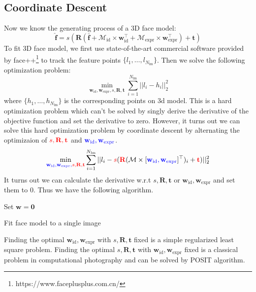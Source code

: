 \subsection{Coordinate Descent}
Now we know the generating process of a 3D face model:
$$\hat{\mathbf{f}} = s (\mathbf{R} (\bar{\mathbf{f}} + \mathcal{M}_{\text{id}} \times \mathbf{w}_{\text{id}}^\top + \mathcal{M}_{\text{expr}}\times \mathbf{w}_{\text{expr}}^\top) + \mathbf{t})$$
To fit 3D face model, we first use state-of-the-art commercial software provided by face++\footnote{https://www.faceplusplus.com.cn/} to track the feature points $\{l_1, \dots, l_{N_{\text{lm}}}\}$. Then we solve the following optimization problem:
$$\min_{\mathbf{w}_{\text{id}}, \mathbf{w}_{\text{expr}}, s, \mathbf{R}, \mathbf{t}} \sum_{i=1}^{N_{\text{lm}}}||l_i - h_i||_2^2$$
where $\{h_1, \dots, h_{N_{\text{lm}}}\}$ is the corresponding points on 3d model.
This is a hard optimization problem which can't be solved by singly derive the derivative of the objective function and set the derivative to zero. However, it turns out we can solve this hard optimization problem by coordinate descent by alternating the optimizaion of $\color{red}{s, \mathbf{R}, \mathbf{t}}$ and $\color{blue}{\mathbf{w}_{\text{id}}, \mathbf{w}_{\text{expr}}}$.
$$\min_{\color{blue}{\mathbf{w}_{\text{id}}, \mathbf{w}_{\text{expr}}}, \color{red}{s, \mathbf{R}, \mathbf{t}}} \sum_{i=1}^{N_{\text{lm}}}||l_i - \color{red}{s}\color{black}(\color{red}\mathbf{R}\color{black}(\mathcal{M} \times [\color{blue}{\mathbf{w}_{\text{id}}, \mathbf{w}_{\text{expr}}} \color{black}]^\top)_i + \color{red}{\mathbf{t}} \color{black})||_2^2$$
It turns out we can calculate the derivative w.r.t $s, \mathbf{R}, \mathbf{t}$ or $\mathbf{w}_{\text{id}}, \mathbf{w}_{\text{expr}}$ and set them to $0$. Thus we have the following algorithm.


\begin{algorithm}[H]
Set $\mathbf{w} = \mathbf{0}$\;
\caption{Fit face model to a single image}
\end{algorithm}
Finding the optimal $\mathbf{w}_{\text{id}}, \mathbf{w}_{\text{expr}}$ with $s, \mathbf{R}, \mathbf{t}$ fixed is a simple regularized least square problem. Finding the optimal $s, \mathbf{R}, \mathbf{t}$ with $\mathbf{w}_{\text{id}}, \mathbf{w}_{\text{expr}}$ fixed is a classical problem in computational photography and can be solved by POSIT algorithm\cite{dementhon1995model}.


